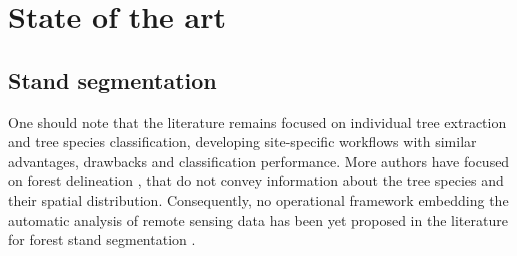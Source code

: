 \checktoopen
\chapter{State of the art} %
\label{Chapter1} %

\startcontents[chapters]
\Mprintcontents





\section{Stand segmentation}
One should note that the literature remains focused on individual tree extraction and tree species classification, developing site-specific workflows with similar advantages, drawbacks and classification performance. More authors have focused on forest delineation \citep{eysn2012forest}, that do not convey information about the tree species and their spatial distribution. Consequently, no operational framework embedding the automatic analysis of remote sensing data has been yet proposed in the literature for forest stand segmentation \citep{clement_IJPRS}. \\

